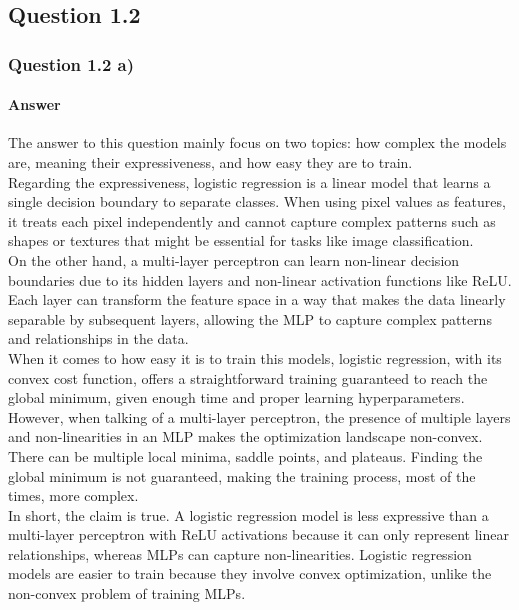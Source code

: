 \documentclass{article}
\begin{document}
\subsection{Question 1.2}

\subsubsection{Question 1.2 a)}

\paragraph{Answer}
The answer to this question mainly focus on two topics: how complex the models are, meaning their expressiveness, and how easy they are to train. \\
Regarding the expressiveness, logistic regression is a linear model that learns a single decision boundary to separate classes. 
When using pixel values as features, it treats each pixel independently and cannot capture complex patterns such as shapes or textures 
that might be essential for tasks like image classification.\\ 
On the other hand, a multi-layer perceptron can learn non-linear decision boundaries due to its hidden layers and non-linear activation functions like ReLU. 
Each layer can transform the feature space in a way that makes the data linearly separable by subsequent layers, allowing the MLP to capture 
complex patterns and relationships in the data.\\
When it comes to how easy it is to train this models, logistic regression, with its convex cost function, offers a straightforward training guaranteed 
to reach the global minimum, given enough time and proper learning hyperparameters. 
However, when talking of a multi-layer perceptron, the presence of multiple layers and non-linearities in an MLP makes the optimization landscape non-convex. 
There can be multiple local minima, saddle points, and plateaus. Finding the global minimum is not guaranteed, making the training process, 
most of the times, more complex.\\
In short, the claim is true. A logistic regression model is less expressive than a multi-layer perceptron with ReLU activations because it can only 
represent linear relationships, whereas MLPs can capture non-linearities. Logistic regression models are easier to train because they involve 
convex optimization, unlike the non-convex problem of training MLPs.
\end{document}
